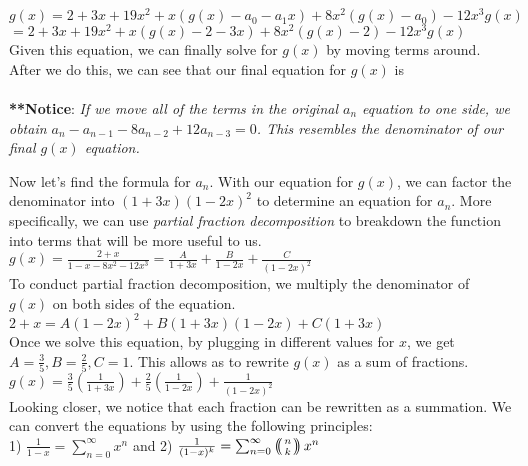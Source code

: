 \begin{solution}
$g(x) = 2 + 3x + 19x^2 + x(g(x) - a_0 - a_1x) + 8x^2(g(x) - a_0) - 12x^3g(x)$
\\ \indent \indent $ = 2 + 3x + 19x^2 + x(g(x) - 2 - 3x) + 8x^2(g(x) - 2) - 12x^3g(x)$ \\

\noindent
Given this equation, we can finally solve for $g(x)$ by moving terms around. After we do this, we can see that our final equation for $g(x)$ is \\

\\

\noindent\normalsize
\textbf{**Notice}: \textit{If we move all of the terms in the original $a_n$ equation to one side, we obtain $a_n - a_{n-1} - 8a_{n-2} + 12a_{n-3} = 0$. This resembles the denominator of our final $g(x)$ equation.} 

\noindent
Now let's find the formula for $a_n$. With our equation for $g(x)$, we can factor the denominator into $(1 + 3x)(1 - 2x)^2$ to determine an equation for $a_n$. More specifically, we can use \textit{partial fraction decomposition} to breakdown the function into terms that will be more useful to us.\\

$g(x) = \frac{2 + x}{1 - x - 8x^2 - 12x^3} = \frac{A}{1 + 3x} + \frac{B}{1 - 2x} + \frac{C}{(1-2x)^2}$ \\

\noindent
To conduct partial fraction decomposition, we multiply the denominator of $g(x)$ on both sides of the equation.\\

$2 + x = A(1-2x)^2 + B(1 + 3x)(1 - 2x) + C(1 + 3x)$\\

\noindent
Once we solve this equation, by plugging in different values for $x$, we get 
$A = \frac{3}{5}, B = \frac{2}{5}, C = 1$. This allows as to rewrite $g(x)$ as a sum of fractions. \\

{$g(x) = \frac{3}{5}(\frac{1}{1 + 3x}) + \frac{2}{5}(\frac{1}{1 - 2x}) + \frac{1}{(1-2x)^2}$}\\

\noindent\normalsize
Looking closer, we notice that each fraction can be rewritten as a summation. We can convert the equations by using the following principles:\\

1) $\frac{1}{1 - x} = \sum_{n = 0}^\infty x^n$ and 
2) $\frac{1}{(1 - x)^k} = \sum_{n = 0}^\infty \multiset{n}{k}x^n$\\


\end{solution}
